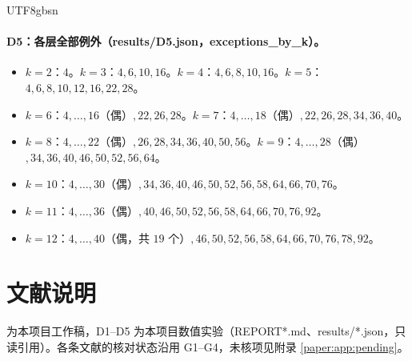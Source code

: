 \documentclass[11pt,a4paper]{article}
\theoremstyle{plain}
\theoremstyle{definition}
\begin{document}
\begin{CJK}{UTF8}{gbsn}
\paragraph{D5：各层全部例外（results/D5.json，exceptions\_by\_k）。}
\begin{itemize}[leftmargin=*]
\item $k=2$：$4$。$k=3$：$4,6,10,16$。$k=4$：$4,6,8,10,16$。$k=5$：$4,6,8,10,12,16,22,28$。
\item $k=6$：$4,\dots,16$（偶）$,22,26,28$。$k=7$：$4,\dots,18$（偶）$,22,26,28,34,36,40$。
\item $k=8$：$4,\dots,22$（偶）$,26,28,34,36,40,50,56$。$k=9$：$4,\dots,28$（偶）$,34,36,40,46,50,52,56,64$。
\item $k=10$：$4,\dots,30$（偶）$,34,36,40,46,50,52,56,58,64,66,70,76$。
\item $k=11$：$4,\dots,36$（偶）$,40,46,50,52,56,58,64,66,70,76,92$。
\item $k=12$：$4,\dots,40$（偶，共 $19$ 个）$,46,50,52,56,58,64,66,70,76,78,92$。
\end{itemize}

\section*{文献说明}
\cite{G1,G2,G3,G4} 为本项目工作稿，D1--D5 为本项目数值实验（REPORT*.md、results/*.json，只读引用）。各条文献的核对状态沿用 G1--G4，未核项见附录 \ref{paper:app:pending}。


\end{CJK}
\end{document}

